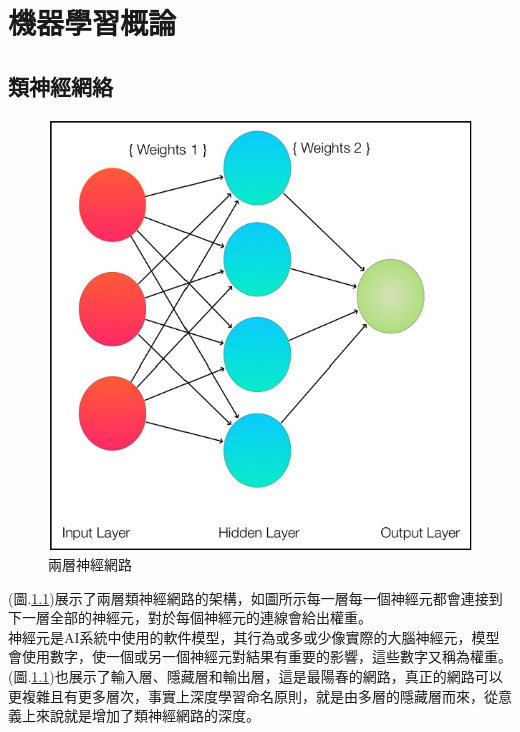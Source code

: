 \documentclass[14pt,a4paper]{report}  %
\begin{document}
\renewcommand{\baselinestretch}{0.5} %
\chapter{機器學習概論}
\section{類神經網絡}
\begin{figure}[hbt!]
\begin{center}
\includegraphics[scale=0.74]{兩層神經網路}
\caption{\Large 兩層神經網路}\label{兩層神經網路}
\end{center}
\end{figure}

 (圖.\ref{兩層神經網路})展示了兩層類神經網路的架構，如圖所示每一層每一個神經元都會連接到下一層全部的神經元，對於每個神經元的連線會給出權重。\\

 神經元是AI系統中使用的軟件模型，其行為或多或少像實際的大腦神經元，模型會使用數字，使一個或另一個神經元對結果有重要的影響，這些數字又稱為權重。\\

 (圖.\ref{兩層神經網路})也展示了輸入層、隱藏層和輸出層，這是最陽春的網路，真正的網路可以更複雜且有更多層次，事實上深度學習命名原則，就是由多層的隱藏層而來，從意義上來說就是增加了類神經網路的深度。\\
\end{document}
